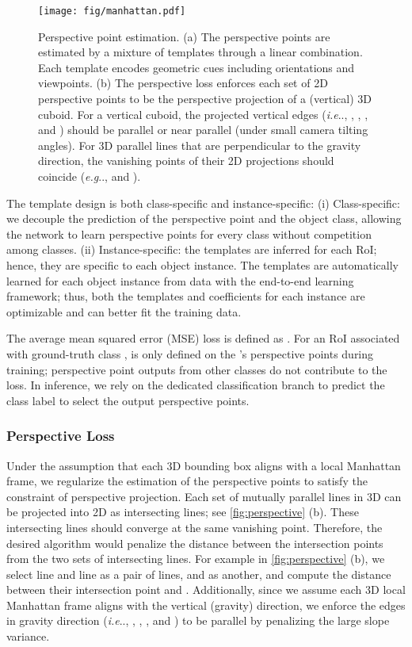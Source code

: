 \documentclass{article}
\makeatletter
\DeclareRobustCommand\onedot{\futurelet\@let@token\@onedot}
\def\@onedot{\ifx\@let@token.\else.\null\fi\xspace}
\def\eg{\emph{e.g}\onedot} \def\Eg{\emph{E.g}\onedot}
\def\ie{\emph{i.e}\onedot} \def\Ie{\emph{I.e}\onedot}
\makeatother
\begin{document}

\begin{figure}[t!]
    \begin{center}
        \texttt{[image: fig/manhattan.pdf]}
    \end{center}
    \caption{Perspective point estimation. (a) The perspective points are estimated by a mixture of templates through a linear combination. Each template encodes geometric cues including orientations and viewpoints. (b) The perspective loss enforces each set of 2D perspective points to be the perspective projection of a (vertical) 3D cuboid. For a vertical cuboid, the projected vertical edges (\ie, , , , and ) should be parallel or near parallel (under small camera tilting angles). For 3D parallel lines that are perpendicular to the gravity direction, the vanishing points of their 2D projections should coincide (\eg,  and ).}
    \label{fig:perspective}
\end{figure}

The template design is both class-specific and instance-specific: (i) Class-specific: we decouple the prediction of the perspective point and the object class, allowing the network to learn perspective points for every class without competition among classes. (ii) Instance-specific: the templates are inferred for each RoI; hence, they are specific to each object instance. The templates are automatically learned for each object instance from data with the end-to-end learning framework; thus, both the templates and coefficients for each instance are optimizable and can better fit the training data.

The average mean squared error (MSE) loss is defined as . For an RoI associated with ground-truth class ,  is only defined on the 's perspective points during training; perspective point outputs from other classes do not contribute to the loss. In inference, we rely on the dedicated classification branch to predict the class label to select the output perspective points.

\subsubsection{Perspective Loss}

Under the assumption that each 3D bounding box aligns with a local Manhattan frame, we regularize the estimation of the perspective points to satisfy the constraint of perspective projection. Each set of mutually parallel lines in 3D can be projected into 2D as intersecting lines; see \autoref{fig:perspective} (b). These intersecting lines should converge at the same vanishing point. Therefore, the desired algorithm would penalize the distance between the intersection points from the two sets of intersecting lines. For example in \autoref{fig:perspective} (b), we select line  and line  as a pair of lines,  and  as another, and compute the distance between their intersection point  and . Additionally, since we assume each 3D local Manhattan frame aligns with the vertical (gravity) direction, we enforce the edges in gravity direction (\ie, , , , and ) to be parallel by penalizing the large slope variance.
\end{document}
